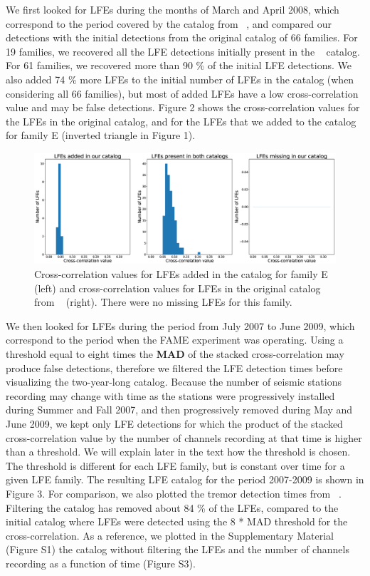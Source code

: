 \documentclass[draft]{agujournal2019}
\begin{document}
We first looked for LFEs during the months of March and April 2008, which correspond to the period covered by the catalog from ~, and compared our detections with the initial detections from the original catalog of 66 families. For 19 families, we recovered all the LFE detections initially present in the ~ catalog. For 61 families, we recovered more than 90 \% of the initial LFE detections. We also added 74 \% more LFEs to the initial number of LFEs in the catalog (when considering all 66 families), but most of added LFEs have a low cross-correlation value and may be false detections. Figure 2 shows the cross-correlation values for the LFEs in the original catalog, and for the LFEs that we added to the catalog for family E (inverted triangle in Figure 1). \\

\begin{figure}
\noindent\includegraphics[width=\textwidth, trim={7.5cm 1cm 28cm 2cm},clip]{figures/hist.eps}
\caption{Cross-correlation values for LFEs added in the catalog for family E (left) and cross-correlation values for LFEs in the original catalog from ~ (right). There were no missing LFEs for this family.}
\label{pngfiguresample}
\end{figure}

We then looked for LFEs during the period from July 2007 to June 2009, which correspond to the period when the FAME experiment was operating. Using a threshold equal to eight times the \textbf{MAD} of the stacked cross-correlation may produce false detections, therefore we filtered the LFE detection times before visualizing the two-year-long catalog. Because the number of seismic stations recording may change with time as the stations were progressively installed during Summer and Fall 2007, and then progressively removed during May and June 2009, we kept only LFE detections for which the product of the stacked cross-correlation value by the number of channels recording at that time is higher than a threshold. We will explain later in the text how the threshold is chosen. The threshold is different for each LFE family, but is constant over time for a given LFE family. The resulting LFE catalog for the period 2007-2009 is shown in Figure 3. For comparison, we also plotted the tremor detection times from ~. Filtering the catalog has removed about 84 \% of the LFEs, compared to the initial catalog where LFEs were detected using the 8 * MAD threshold for the cross-correlation. As a reference, we plotted in the Supplementary Material (Figure S1) the catalog without filtering the LFEs and the number of channels recording as a function of time (Figure S3). \\
\end{document}
